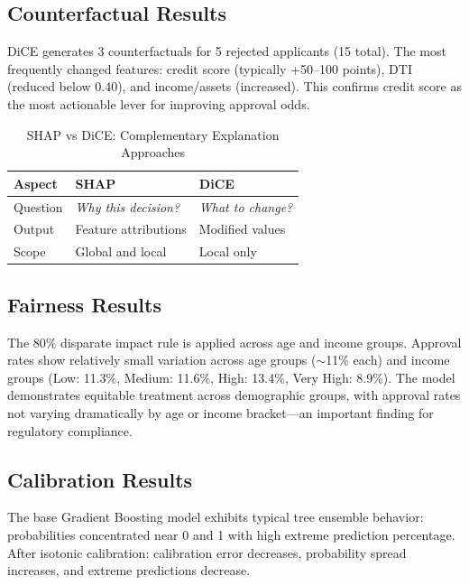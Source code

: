 \documentclass[journal]{IEEEtran}
\begin{document}
\subsection{Counterfactual Results}

DiCE generates 3 counterfactuals for 5 rejected applicants (15 total). The most frequently changed features: credit score (typically +50--100 points), DTI (reduced below 0.40), and income/assets (increased). This confirms credit score as the most actionable lever for improving approval odds.

\begin{table}[!t]
\centering
\caption{SHAP vs DiCE: Complementary Explanation Approaches}
\label{tab:shap_vs_dice}
\begin{tabular}{lp{2.5cm}p{2.5cm}}
\toprule
\textbf{Aspect} & \textbf{SHAP} & \textbf{DiCE} \\
\midrule
Question & \textit{Why this decision?} & \textit{What to change?} \\
Output   & Feature attributions & Modified values \\
Scope    & Global and local & Local only \\
\bottomrule
\end{tabular}
\end{table}


\subsection{Fairness Results}

The 80\% disparate impact rule is applied across age and income groups. Approval rates show relatively small variation across age groups ($\sim$11\% each) and income groups (Low: 11.3\%, Medium: 11.6\%, High: 13.4\%, Very High: 8.9\%). The model demonstrates equitable treatment across demographic groups, with approval rates not varying dramatically by age or income bracket---an important finding for regulatory compliance.


\subsection{Calibration Results}

The base Gradient Boosting model exhibits typical tree ensemble behavior: probabilities concentrated near 0 and 1 with high extreme prediction percentage. After isotonic calibration: calibration error decreases, probability spread increases, and extreme predictions decrease.
\end{document}
